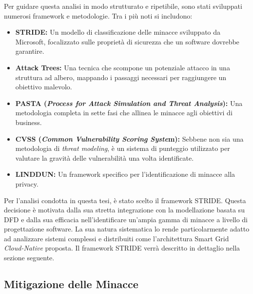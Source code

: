 Per guidare questa analisi in modo strutturato e ripetibile, sono stati sviluppati numerosi framework e metodologie. Tra i più noti si includono:


\begin{itemize}
    \item \textbf{STRIDE:} Un modello di classificazione delle minacce sviluppato da Microsoft, focalizzato sulle proprietà di sicurezza che un software dovrebbe garantire.
    \item \textbf{Attack Trees: }Una tecnica che scompone un potenziale attacco in una struttura ad albero, mappando i passaggi necessari per raggiungere un obiettivo malevolo.
    \item \textbf{PASTA (\textit{Process for Attack Simulation and Threat Analysis}):} Una metodologia completa in sette fasi che allinea le minacce agli obiettivi di business.
    \item \textbf{CVSS (\textit{Common Vulnerability Scoring Syste}m):} Sebbene non sia una metodologia di \textit{threat modeling}, è un sistema di punteggio utilizzato per valutare la gravità delle vulnerabilità una volta identificate.
    \item \textbf{LINDDUN:} Un framework specifico per l'identificazione di minacce alla privacy.
\end{itemize}


Per l'analisi condotta in questa tesi, è stato scelto il framework STRIDE. Questa decisione è motivata dalla sua stretta integrazione con la modellazione basata su DFD e dalla sua efficacia nell'identificare un'ampia gamma di minacce a livello di progettazione software. La sua natura sistematica lo rende particolarmente adatto ad analizzare sistemi complessi e distribuiti come l'architettura Smart Grid \textit{Cloud-Native} proposta. Il framework STRIDE verrà descritto in dettaglio nella sezione seguente.


\subsection{Mitigazione delle Minacce}


